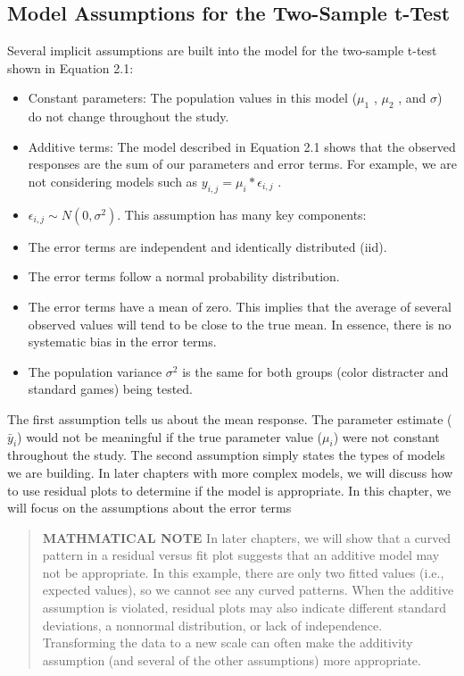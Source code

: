 \documentclass[
]{report}
\providecommand{\tightlist}{%
  \setlength{\itemsep}{0pt}\setlength{\parskip}{0pt}}
\begin{document}
\hypertarget{model-assumptions-for-the-two-sample-t-test}{%
\subsection{Model Assumptions for the Two-Sample t-Test}\label{model-assumptions-for-the-two-sample-t-test}}

Several implicit assumptions are built into the model for the two-sample t-test shown in Equation 2.1:

\begin{itemize}
\tightlist
\item
  Constant parameters: The population values in this model (\(\mu_1\) , \(\mu_2\) , and \(\sigma\)) do not change throughout the study.
\item
  Additive terms: The model described in Equation 2.1 shows that the observed responses are the sum of our parameters and error terms. For example, we are not considering models such as
  \(y_{i, j} = \mu_i * \epsilon_{i, j}\) .
\item
  \(\epsilon_{i, j} \sim N(0,\sigma^2)\). This assumption has many key components:
\item
  The error terms are independent and identically distributed (iid).
\item
  The error terms follow a normal probability distribution.
\item
  The error terms have a mean of zero. This implies that the average of several observed values will tend to be close to the true mean. In essence, there is no systematic bias in the error terms.
\item
  The population variance \(\sigma^2\) is the same for both groups (color distracter and standard games) being tested.
\end{itemize}

The first assumption tells us about the mean response. The parameter estimate (\(\bar{y}_i\)) would not be meaningful if the true parameter value (\(\mu_i\)) were not constant throughout the study. The second assumption simply states the types of models we are building. In later chapters with more complex models, we will discuss how to use residual plots to determine if the model is appropriate. In this chapter, we will focus on the assumptions about the error terms

\begin{quote}
\textbf{MATHMATICAL NOTE}
In later chapters, we will show that a curved pattern in a residual versus fit plot suggests that an additive model may not be appropriate. In this example, there are only two fitted values (i.e., expected values), so we cannot see any curved patterns. When the additive assumption is violated, residual plots may also indicate different standard deviations, a nonnormal distribution, or lack of independence. Transforming the data to a new scale can often make the additivity assumption (and several of the other assumptions) more appropriate.
\end{quote}
\end{document}

